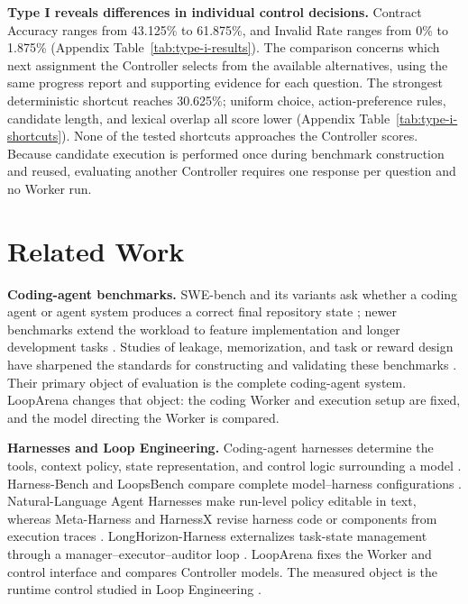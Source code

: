 \noindent\textbf{Type I reveals differences in individual control decisions.}
Contract Accuracy ranges from 43.125\% to 61.875\%, and Invalid Rate ranges from 0\% to 1.875\% (Appendix Table~\ref{tab:type-i-results}). The comparison concerns which next assignment the Controller selects from the available alternatives, using the same progress report and supporting evidence for each question. The strongest deterministic shortcut reaches 30.625\%; uniform choice, action-preference rules, candidate length, and lexical overlap all score lower (Appendix Table~\ref{tab:type-i-shortcuts}). None of the tested shortcuts approaches the Controller scores. Because candidate execution is performed once during benchmark construction and reused, evaluating another Controller requires one response per question and no Worker run.

\section{Related Work}
\label{sec:related}

\textbf{Coding-agent benchmarks.} SWE-bench and its variants ask whether a coding agent or agent system produces a correct final repository state \citep{Jimenez2023,OpenAI2024Verified,MultiSWEBench2025,SWEBenchPro2025}; newer benchmarks extend the workload to feature implementation and longer development tasks \citep{FeatBench2025,LongCLIBench2026,SlopCodeBench,BeyondSWE2026,Le2026SWEEVO,Huang2026DeepSWE}. Studies of leakage, memorization, and task or reward design have sharpened the standards for constructing and validating these benchmarks \citep{CodeEvalLeakage2024,CodeContamination2024,SWEBenchIllusion2025,ABCBench2025,LiveCodeBench2024,SWEReBench2025}. Their primary object of evaluation is the complete coding-agent system. LoopArena changes that object: the coding Worker and execution setup are fixed, and the model directing the Worker is compared.

\textbf{Harnesses and Loop Engineering.} Coding-agent harnesses determine the tools, context policy, state representation, and control logic surrounding a model \citep{Wang2024OpenHands,Yang2024SWEAgent,InsideScaffold2026}. Harness-Bench and LoopsBench compare complete model--harness configurations \citep{HarnessBench2026,LoopsBench2026}. Natural-Language Agent Harnesses make run-level policy editable in text, whereas Meta-Harness and HarnessX revise harness code or components from execution traces \citep{Pan2026NLAH,Lee2026MetaHarness,Chen2026HarnessX}. LongHorizon-Harness externalizes task-state management through a manager--executor--auditor loop \citep{longhorizonharness2026}. LoopArena fixes the Worker and control interface and compares Controller models. The measured object is the runtime control studied in Loop Engineering \citep{Osmani2026LoopEng,NewStack2026Loops}.

